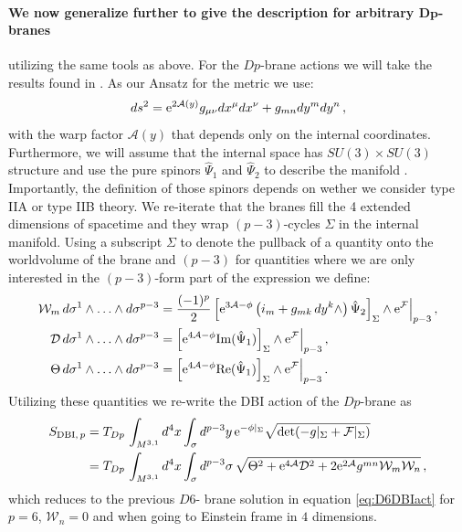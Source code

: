 \documentclass[a4paper,12pt]{report}
\newcommand{\be}{\begin{equation}}
\newcommand{\ee}{\end{equation}}
\newcommand{\bea}{\begin{equation}\begin{aligned}}
\newcommand{\eea}{\end{aligned}\end{equation}}
\def\rme{{\rm e}}
\def\rmre{{\rm Re}}
\def\rmim{{\rm Im}}
\begin{document}
\paragraph{We now generalize further to give the description for arbitrary $\mathbf{Dp}$-branes} utilizing the same tools as above. For the $Dp$-brane actions we will take the results found in \cite{Martucci:2005ht,Martucci:2006ij}. As our Ansatz for the metric we use:
\be 
ds^2 = \rme^{2\mathcal{A}(y)} g_{\mu \nu} dx^\mu dx^\nu + g_{mn} dy^m dy^n \,,
\ee
with the warp factor $\mathcal{A}(y)$ that depends only on the internal coordinates. Furthermore, we will assume that the internal space has $SU(3)\times SU(3)$ structure and use the pure spinors $\hat{\Psi}_1$ and $\hat{\Psi}_2$ to describe the manifold \cite{Martucci:2005ht}. Importantly, the definition of those spinors depends on wether we consider type IIA or type IIB theory. We re-iterate that the branes fill the 4 extended dimensions of spacetime and they wrap $(p-3)$-cycles $\Sigma$ in the internal manifold. Using a subscript $\Sigma$ to denote the pullback of a quantity onto the worldvolume of the brane and $(p-3)$ for quantities where we are only interested in the $(p-3)$-form part of the expression we define:
\bea 
\mathcal{W}_m \, d\sigma^1 \wedge \ldots \wedge d\sigma^{p-3} &= \frac{(-1)^p}{2} \left[\rme^{3\mathcal{A}-\phi} \left( i_m + g_{mk}\,dy^k \wedge \right) \hat{\Psi}_2 \right]_\Sigma \wedge \rme^{\mathcal{F}}\Big|_{p-3}\,,\\
\mathcal{D} \, d\sigma^1 \wedge \ldots \wedge d\sigma^{p-3} &= \left[\rme^{4\mathcal{A}-\phi} \rmim(\hat{\Psi}_1)\right]_\Sigma \wedge \rme^{\mathcal{F}}\Big|_{p-3}\,,\\
\Theta \, d\sigma^1 \wedge \ldots \wedge d\sigma^{p-3} &= \left[\rme^{4\mathcal{A}-\phi} \rmre(\hat{\Psi}_1)\right]_\Sigma \wedge \rme^{\mathcal{F}}\Big|_{p-3}\,.
\eea 
Utilizing these quantities we re-write the DBI action of the $Dp$-brane as
\bea
S_{\text{DBI},\,p} &= T_{Dp} \, \int_{M^{3,1}} d^4x \int_\sigma d^{p-3}y \, \rme^{-\phi|_\Sigma} \sqrt{\det(-g|_\Sigma + \mathcal{F}|_\Sigma)}\\
&= T_{Dp} \, \int_{M^{3,1}} d^4x \int_\sigma d^{p-3}\sigma \, \sqrt{\Theta^2 + \rme^{4\mathcal{A}} \mathcal{D}^2 + 2 \rme^{2\mathcal{A}} g^{mn} \mathcal{W}_m \mathcal{W}_n}\,,
\eea
which reduces to the previous $D6$- brane solution in equation \eqref{eq:D6DBIact} for $p=6$, $\mathcal{W}_n = 0$ and when going to Einstein frame in $4$ dimensions.\\
\end{document}
